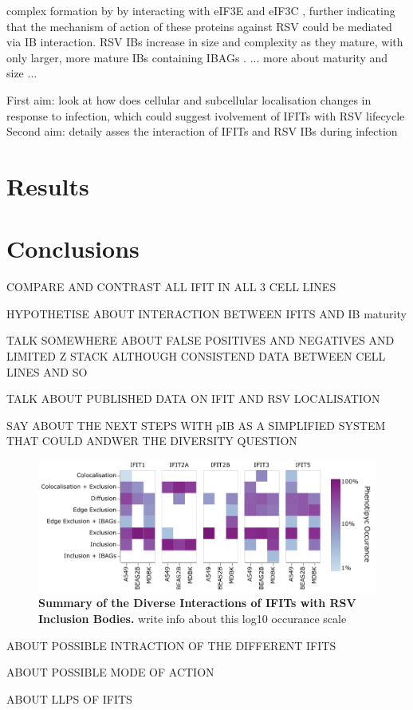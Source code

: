 complex formation by by interacting with eIF3E and eIF3C \cite{Diamond2014IFIT1:Translation, Guo2000CharacterizationVirus}, further indicating that the mechanism of action of these proteins against RSV could be mediated via IB interaction. RSV IBs increase in size and complexity as they mature, with only larger, more mature IBs containing IBAGs \cite{Rincheval2017FunctionalVirus, Jobe2021BovineResponses}. ... more about maturity and size ...



First aim: look at how does cellular and subcellular localisation changes in response to infection, which could suggest ivolvement of IFITs with RSV lifecycle
Second aim: detaily asses the interaction of IFITs and RSV IBs during infection

\section{Results} \label{sec:Results-Chapter3}



\section{Conclusions} \label{sec:Conclusions-Chapter3}
COMPARE AND CONTRAST ALL IFIT IN ALL 3 CELL LINES

HYPOTHETISE ABOUT INTERACTION BETWEEN IFITS AND IB maturity

TALK SOMEWHERE ABOUT FALSE POSITIVES AND NEGATIVES AND LIMITED Z STACK 
ALTHOUGH CONSISTEND DATA BETWEEN CELL LINES AND SO

TALK ABOUT PUBLISHED DATA ON IFIT AND RSV LOCALISATION


SAY ABOUT THE NEXT STEPS WITH pIB AS A SIMPLIFIED SYSTEM THAT COULD ANDWER THE DIVERSITY QUESTION


\begin{figure}
    \centering
    \includegraphics[width=1\linewidth]{08. Chapter 3/Figs/heatmap_infection.pdf}
    \caption[Summary of the Diverse Interactions of IFITs with RSV Inclusion Bodies.]{\textbf{Summary of the Diverse Interactions of IFITs with RSV Inclusion Bodies.} write info about this log10 occurance scale}
    \label{fig:Summary of the Diverse Interactions of IFITs with RSV Inclusion Bodies}
\end{figure}

ABOUT POSSIBLE INTRACTION OF THE DIFFERENT IFITS

ABOUT POSSIBLE MODE OF ACTION

ABOUT LLPS OF IFITS


